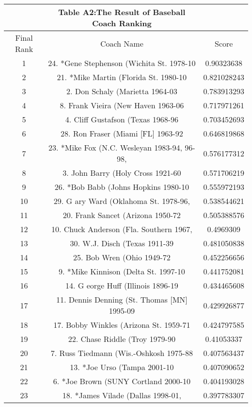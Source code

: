 \documentclass{mcmthesis}
\begin{document}
\begin{appendices}
\begin{longtable}{ccc}
 &Table A2:The Result of Baseball Coach Ranking&\\
 \hline
Final Rank & Coach Name & Score\\
\hline
\endhead
1     & 24. *Gene Stephenson (Wichita St. 1978-10 & 0.90323638 \\
    2     & 21. *Mike Martin (Florida St. 1980-10 & 0.821028243 \\
    3     & 2. Don Schaly (Marietta 1964-03 & 0.783913293 \\
    4     & 8. Frank Vieira (New Haven 1963-06 & 0.717971261 \\
    5     & 4. Cliff Gustafson (Texas 1968-96 & 0.703452693 \\
    6     & 28. Ron Fraser (Miami [FL] 1963-92 & 0.646819868 \\
    7     & 23. *Mike Fox (N.C. Wesleyan 1983-94, 96-98, & 0.576177312 \\
    8     & 3. John Barry (Holy Cross 1921-60 & 0.571706219 \\
    9     & 26. *Bob Babb (Johns Hopkins 1980-10 & 0.555972193 \\
    10    & 29. G ary Ward (Oklahoma St. 1978-96, & 0.538544621 \\
    11    & 20. Frank Sancet (Arizona 1950-72 & 0.505388576 \\
    12    & 10. Chuck Anderson (Fla. Southern 1967, & 0.4969309 \\
    13    & 30. W.J. Disch (Texas 1911-39 & 0.481050838 \\
    14    & 25. Bob Wren (Ohio 1949-72 & 0.452256656 \\
    15    & 9. *Mike Kinnison (Delta St. 1997-10 & 0.441752081 \\
    16    & 14. G eorge Huff (Illinois 1896-19 & 0.434465608 \\
    17    & 11. Dennis Denning (St. Thomas [MN] 1995-09 & 0.429926877 \\
    18    & 17. Bobby Winkles (Arizona St. 1959-71 & 0.424797585 \\
    19    & 22. Chase Riddle (Troy 1979-90 & 0.41053337 \\
    20    & 7. Russ Tiedmann (Wis.-Oshkosh 1975-88 & 0.407563437 \\
    21    & 13. *Joe Urso (Tampa 2001-10 & 0.407090652 \\
    22    & 6. *Joe Brown (SUNY Cortland 2000-10 & 0.404193028 \\
    23    & 18. *James Vilade (Dallas 1998-01, & 0.397783307 \\

\end{longtable}
\end{appendices}
\end{document}
